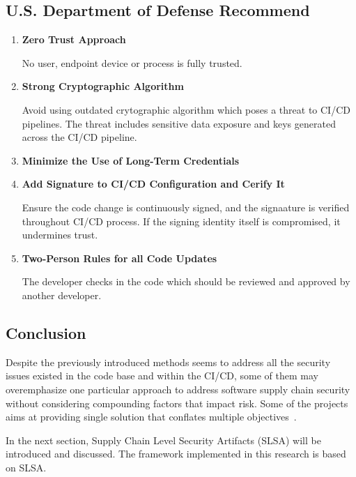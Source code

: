 \subsection{ U.S. Department of Defense Recommend \cite{DoDDefCI/CD2023}}
\begin{enumerate}
    \item \textbf{Zero Trust Approach}
    
        No user, endpoint device or process is fully trusted.

    \item \textbf{Strong Cryptographic Algorithm}
    
        Avoid using outdated crytographic algorithm which poses a threat to CI/CD pipelines.
        The threat includes sensitive data exposure and keys generated across the CI/CD 
        pipeline.

    \item \textbf{Minimize the Use of Long-Term Credentials}

    \item \textbf{Add Signature to CI/CD Configuration and Cerify It}

        Ensure the code change is continuously signed, and the signaature is verified throughout
        CI/CD process. If the signing identity itself is compromised, it undermines trust.
    
    \item \textbf{Two-Person Rules for all Code Updates}

        The developer checks in the code which should be reviewed and approved by another 
        developer. 

\end{enumerate}

\subsection{Conclusion}

Despite the previously introduced methods seems to address all the security issues
existed in the code base and within the CI/CD, some of them may overemphasize one 
particular approach to address software supply chain security without considering 
compounding factors that impact risk.
Some of the projects aims at providing single solution that conﬂates multiple 
objectives~\cite{melara2022software}.

In the next section, Supply Chain Level Security Artifacts (SLSA) will be introduced and
discussed. The framework implemented in this research is based on SLSA.

